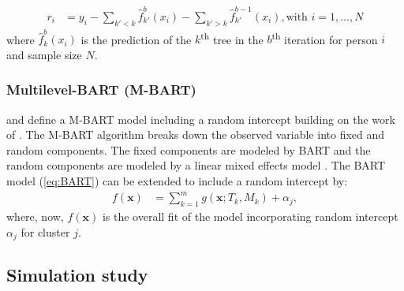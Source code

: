 \documentclass[10pt, a4paper, titlepage]{article}
\begin{document}
\begin{align}
\label{eq:partialresiduals}
r_i &= y_i - \sum_{k' < k} \hat{f}^{b}_{k'}(x_{i}) - \sum_{k' > k} \hat{f}^{b-1}_{k'}(x_{i}), \text{with } i = 1, \dots, N 
\end{align} where $\hat{f}^{b}_{k}(x_{i})$ is the prediction of the $k$\textsuperscript{th} tree in the $b$\textsuperscript{th} iteration for person $i$ and sample size $N$.

\subsubsection{Multilevel-BART (M-BART)}
\citet{chen2020, wagner2020} and \citet{tan2016} define a M-BART model including a random intercept building on the work of \citet{lin2019}. The M-BART algorithm breaks down the observed variable into fixed and random components. The fixed components are modeled by BART and the random components are modeled by a linear mixed effects model \citep{chen2020, wagner2020, tan2016}. The BART model (\ref{eq:BART}) can be extended to include a random intercept by:
\begin{align} 
\label{eq:M-BART}
f(\textbf{x}) &= \sum^{m}_{k=1}g(\textbf{x}; T_{k}, M_{k}) + \alpha_{j}, 
\end{align} where, now, $f(\textbf{x})$ is the overall fit of the model incorporating random intercept $\alpha_{j}$ for cluster $j$.

\subsection{Simulation study}
\end{document}
